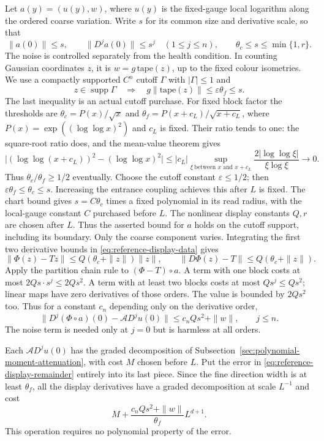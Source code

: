 Let $a(y)=(u(y),w)$, where $u(y)$ is the fixed-gauge local
logarithm along the ordered coarse variation. Write $s$ for its
common size and derivative scale, so that
\[
 \|a(0)\|\le s,\qquad
 \|D^ja(0)\|\le s^j\quad(1\le j\le n),\qquad
                  \theta_c\le s\le\min\{1,r\}.
\]
The noise is controlled separately from the health condition. In counting
Gaussian coordinates $z$, it is $w=g\,\mathrm{tape}(z)$, up to the fixed
colour isometries. We use a compactly supported $C^n$ cutoff $\Gamma$
with $|\Gamma|\le1$ and
\[
 z\in\operatorname{supp}\Gamma
 \quad\Longrightarrow\quad g\|\mathrm{tape}(z)\|
             \le\varepsilon\theta_f\le s.
\]
The last inequality is an actual cutoff purchase. For fixed block
factor the thresholds are
$\theta_c=P(x)/\sqrt{x}$ and
$\theta_f=P(x+c_L)/\sqrt{x+c_L}$, where
$P(x)=\exp((\log\log x)^2)$ and $c_L$ is fixed. Their ratio tends
to one: the square-root ratio does, and the mean-value theorem gives
\[
 \big|(\log\log(x+c_L))^2-(\log\log x)^2\big|
 \le |c_L|\sup_{\xi\ \text{between }x\text{ and }x+c_L}
           \frac{2|\log\log\xi|}{\xi\log\xi}\longrightarrow0.
\]
Thus $\theta_c/\theta_f\ge1/2$ eventually. Choose the cutoff
constant $\varepsilon\le1/2$; then
$\varepsilon\theta_f\le\theta_c\le s$. Increasing the entrance
coupling achieves this after $L$ is fixed.
The chart bound gives $s=C\theta_c$ times a fixed polynomial in its
read radius, with the local-gauge constant $C$ purchased before $L$.
The nonlinear display constants $Q,r$ are chosen after $L$. Thus the asserted
bound for $a$ holds on the cutoff support, including its boundary.
Only the coarse component varies. Integrating the first two
derivative bounds in \eqref{eq:reference-display-data} gives
\[
 \|\Phi(z)-Tz\|\le Q(\theta_c+\|z\|)\|z\|,
 \qquad \|D\Phi(z)-T\|\le Q(\theta_c+\|z\|).
\]
Apply the partition chain rule to $(\Phi-T)\circ a$. A term
with one block costs at most $2Qs\cdot s^j\le2Qs^2$.
A term with at least two blocks costs at most $Q s^j\le Qs^2$;
linear maps have zero derivatives of those orders. The value is
bounded by $2Qs^2$ too. Thus for a constant $c_n$ depending only
on the derivative order,
\begin{equation}\label{eq:reference-display-remainder}
 \|D^j(\Phi\circ a)(0)-\mathcal A D^ju(0)\|
                    \le c_nQs^2+\|w\|,\qquad j\le n.
\end{equation}
The noise term is needed only at $j=0$ but is harmless at all
orders.

Each $\mathcal A D^ju(0)$ has the graded decomposition of
Subsection~\ref{sec:polynomial-moment-attenuation}, with cost $M$
chosen before $L$. Put the error in
\eqref{eq:reference-display-remainder} entirely into its last
piece. Since the fine direction width is at least $\theta_f$,
all the display derivatives have a graded decomposition at scale
$L^{-1}$ and cost
\begin{equation}\label{eq:reference-graded-cost}
            M+\frac{c_nQs^2+\|w\|}{\theta_f}L^{d+1}.
\end{equation}
This operation requires no polynomial property of the error.

